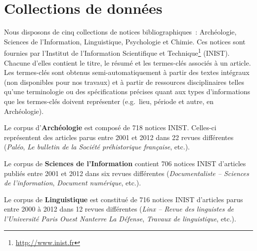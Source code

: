 \section{Collections de données}
\label{sec:presentation_des_donnees}
  Nous disposons de cinq collections de notices bibliographiques~: Archéologie,
  Sciences de l'Information, Linguistique, Psychologie et Chimie. Ces notices
  sont fournies par l'Institut de l’Information Scientifique et
  Technique\footnote{\url{http://www.inist.fr}} (INIST). Chacune d'elles
  contient le titre, le résumé et les termes-clés associés à un article. Les
  termes-clés sont obtenus semi-automatiquement %
  à partir des textes intégraux (non disponibles pour nos travaux) et à partir
  de ressources disciplinaires telles qu'une terminologie ou des spécifications
  précises quant aux types d'informations que les termes-clés doivent
  représenter (e.g.~lieu, période et autre, en Archéologie).

  Le corpus d'\textbf{Archéologie} est composé de 718 notices INIST. Celles-ci
  représentent des articles parus entre 2001 et 2012 dans 22 revues différentes
  (\textit{Paléo}, \textit{Le bulletin de la Société préhistorique française},
  etc.).

  Le corpus de \textbf{Sciences de l'Information} contient 706 notices INIST
  d'articles publiés entre 2001 et 2012 dans six revues différentes
  (\textit{Documentaliste -- Sciences de l'information}, \textit{Document
  numérique}, etc.).

  Le corpus de \textbf{Linguistique} est constitué de 716 notices INIST
  d'articles parus entre 2000 à 2012 dans 12 revues différentes
  (\textit{Linx -- Revue des linguistes de l'Université Paris Ouest Nanterre La
  Défense}, \textit{Travaux de linguistique}, etc.).

